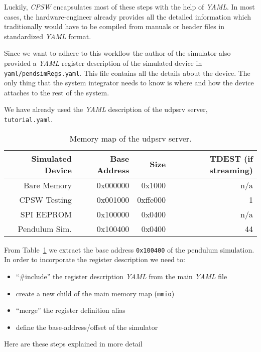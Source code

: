 \documentclass[10pt]{article}
\newcommand{\ita}[1]{\emph{#1}}
\newcommand{\cpsw}      {\ita {CPSW}}
\newcommand{\yaml}      {\ita {YAML}}
\newcommand{\udps}      {udpsrv}
\newcommand{\cod}[1] {{\tt#1}}
\newcommand{\tutyaml} {\cod{tutorial.yaml}}
\newcounter{tbls}
\begin{document}
Luckily, \cpsw{} encapsulates most of these steps with the help of \yaml{}. In most
cases, the hardware-engineer already provides all the detailed information which
traditionally would have to be compiled from manuals or header files in standardized
\yaml{} format.

Since we want to adhere to this workflow the author of the simulator also provided
a \yaml{} register description of the simulated device in \cod{yaml/pendsimRegs.yaml}.
This file contains all the details about the device. The only thing that the system
integrator needs to know is where and how the device attaches to the rest of the system.

We have already used the \yaml{} description of the \udps{} server, \tutyaml{}.
\begin{table}[ht]
\label{tbl:udpsmap}
\hspace*{\fill}
\begin{tabular}{rrrr}
    Simulated Device & Base Address & Size & TDEST (if streaming) \\
\hline
    Bare Memory      & 0x000000     & 0x1000   & n/a \\
    CPSW Testing     & 0x001000     & 0xffe000 &   1 \\
    SPI EEPROM       & 0x100000     & 0x0400   & n/a \\
    Pendulum Sim.    & 0x100400     & 0x0400   &  44 \\
\end{tabular}
\hspace*{\fill}
\caption{Memory map of the \udps{} server.}
\end{table}
From Table~\ref{tbl:udpsmap} we extract the base address \cod{0x100400} of the
pendulum simulation. In order to incorporate the register description we need
to:
\begin{itemize}
\item ``\#include'' the register description \yaml{} from the main \yaml{} file
\item create a new child of the main memory map (\cod{mmio})
\item ``merge'' the register definition alias
\item define the base-address/offset of the simulator
\end{itemize}

Here are these steps explained in more detail
\end{document}
